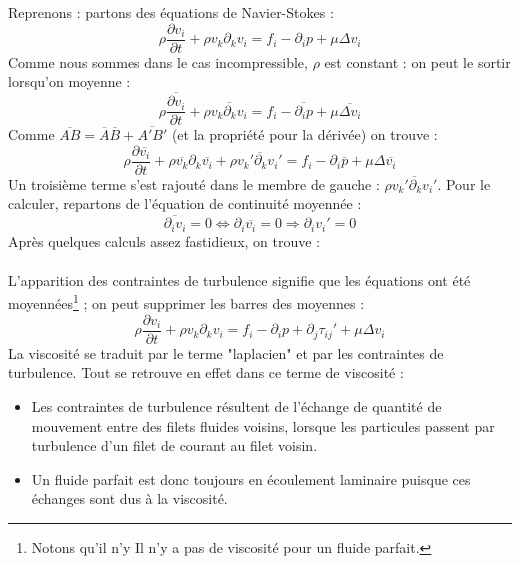 Reprenons : partons des équations de Navier-Stokes :
\begin{equation}
	\rho \frac{\partial v_i}{\partial t} + \rho v_k\partial_kv_i = f_i - \partial_ip + \mu \Delta
	v_i
\end{equation}
Comme nous sommes dans le cas incompressible, $\rho$ est constant : on peut le sortir lorsqu'on 
moyenne :
\begin{equation}
	\rho \frac{\overline{\partial v_i}}{\partial t} + \rho \overline{v_k\partial_kv_i} = f_i - 
	\overline{\partial_ip} + \mu \overline{\Delta v_i}
\end{equation}
Comme $\overline{AB} = \overline{A}\overline{B} + 	\overline{A'B'}$ (et la propriété pour la 
dérivée) on trouve :
\begin{equation}
	\rho \frac{\partial \overline{v_i}}{\partial t} + \rho \overline{v_k}\partial_k\overline{v_i} +
	\rho\overline{v_k'\partial_k v_i'} = f_i - \partial_i\overline{p} + \mu \Delta\overline{v_i}
\end{equation}
Un troisième terme s'est rajouté dans le membre de gauche : $\rho\overline{v_k'\partial_k v_i'}$.
Pour le calculer, repartons de l'équation de continuité moyennée :
\begin{equation}
	\overline{\partial_iv_i} = 0 \Leftrightarrow \partial_i\overline{v_i} = 0 \Rightarrow \partial_i
	v_i'=0
\end{equation}
Après quelques calculs assez fastidieux, on trouve :\\
	
\ \\
L'apparition des contraintes de turbulence signifie que les équations ont été moyennées\footnote{
Notons qu'il n'y Il n'y a pas de viscosité pour un fluide parfait.} ; on peut supprimer les barres 
des moyennes :
\begin{equation}
	\rho \frac{\partial v_i}{\partial t} + \rho v_k\partial_k v_i = f_i - \partial_i p + \partial_j
	\tau_{ij}' +\mu \Delta v_i
\end{equation}
La viscosité se traduit par le terme "laplacien" et par les contraintes de turbulence. Tout se
retrouve en effet dans ce terme de viscosité :
\begin{itemize}
	\item Les contraintes de turbulence résultent de l'échange de quantité de mouvement entre des 
	      filets fluides voisins, lorsque les particules passent par turbulence d'un filet de courant au 
	      filet voisin.
	\item Un fluide parfait est donc toujours en écoulement laminaire puisque ces échanges sont dus 
	      à la viscosité.
\end{itemize}
	
